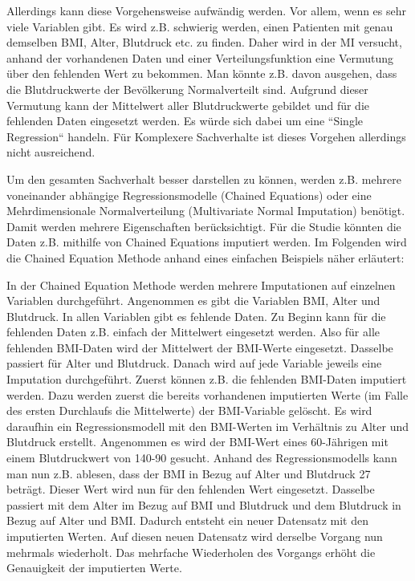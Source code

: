 Allerdings kann diese Vorgehensweise aufwändig werden. Vor allem, wenn es sehr viele Variablen gibt. Es wird z.B. 
schwierig werden, einen Patienten mit genau demselben BMI, Alter, Blutdruck etc. zu finden. Daher wird in 
der MI versucht, anhand der vorhandenen Daten und einer Verteilungsfunktion eine Vermutung über den fehlenden Wert zu 
bekommen. Man könnte z.B. davon ausgehen, dass die Blutdruckwerte der Bevölkerung Normalverteilt sind. Aufgrund dieser Vermutung 
kann der Mittelwert aller Blutdruckwerte gebildet und für die fehlenden Daten eingesetzt werden. Es würde sich dabei um eine ``Single Regression`` handeln. \autocite[3]{Shrive2006}
Für Komplexere Sachverhalte ist 
dieses Vorgehen allerdings nicht ausreichend. \autocite[1089]{Donders2006}

Um den gesamten Sachverhalt besser darstellen zu können, werden z.B. mehrere voneinander abhängige Regressionsmodelle 
(Chained Equations) oder eine Mehrdimensionale Normalverteilung (Multivariate Normal Imputation) benötigt. \autocite[489]{Spratt2010} Damit 
werden mehrere Eigenschaften berücksichtigt. Für die Studie könnten die Daten z.B. mithilfe von Chained Equations imputiert werden. Im Folgenden wird
die Chained Equation Methode anhand eines einfachen Beispiels näher erläutert:

In der Chained Equation Methode werden mehrere Imputationen auf einzelnen Variablen durchgeführt. Angenommen es gibt die Variablen BMI, Alter und Blutdruck. 
In allen Variablen gibt es fehlende Daten. Zu Beginn kann für die fehlenden Daten z.B. einfach der Mittelwert eingesetzt werden. Also für alle fehlenden 
BMI-Daten wird der Mittelwert der BMI-Werte eingesetzt. Dasselbe passiert für Alter und Blutdruck. Danach wird auf jede Variable jeweils eine Imputation durchgeführt. 
Zuerst können z.B. die fehlenden BMI-Daten imputiert werden. Dazu werden zuerst die bereits vorhandenen imputierten Werte (im Falle des ersten Durchlaufs die Mittelwerte)
der BMI-Variable gelöscht. Es wird daraufhin ein Regressionsmodell mit den BMI-Werten im Verhältnis zu Alter und Blutdruck erstellt. Angenommen es wird der BMI-Wert
eines 60-Jährigen mit einem Blutdruckwert von 140-90 gesucht. Anhand des Regressionsmodells kann man nun z.B. ablesen, dass der BMI in Bezug auf Alter und Blutdruck 27 beträgt.
Dieser Wert wird nun für den fehlenden Wert eingesetzt. Dasselbe passiert mit dem Alter im Bezug auf BMI und Blutdruck und dem Blutdruck in Bezug auf Alter und BMI. Dadurch
entsteht ein neuer Datensatz mit den imputierten Werten. Auf diesen neuen Datensatz wird derselbe Vorgang nun mehrmals wiederholt. \autocite[108]{Tilling2016}
Das mehrfache Wiederholen des Vorgangs erhöht die Genauigkeit der imputierten Werte.  


